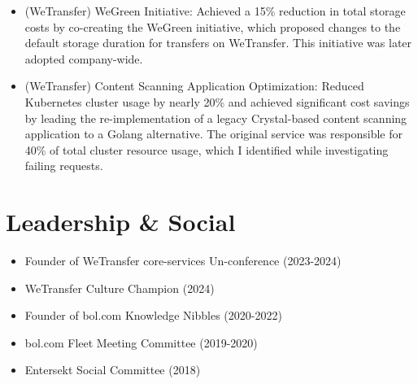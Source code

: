 \documentclass[10pt]{friggeri-cv} %
\begin{document}
\begin{itemize}
    \item (WeTransfer) WeGreen Initiative: Achieved a 15\% reduction in total storage costs by co-creating the WeGreen initiative, which proposed changes to the default storage duration for transfers on WeTransfer. This initiative was later adopted company-wide.
    \item (WeTransfer) Content Scanning Application Optimization: Reduced Kubernetes cluster usage by nearly 20\% and achieved significant cost savings by leading the re-implementation of a legacy Crystal-based content scanning application to a Golang alternative. The original service was responsible for 40\% of total cluster resource usage, which I identified while investigating failing requests.
\end{itemize}

\section{Leadership \& Social}

\begin{itemize}
    \item Founder of WeTransfer core-services Un-conference (2023-2024)
    \item WeTransfer Culture Champion (2024)
    \item Founder of bol.com Knowledge Nibbles (2020-2022)
    \item bol.com Fleet Meeting Committee (2019-2020)
    \item Entersekt Social Committee (2018)
\end{itemize}
\end{document}
